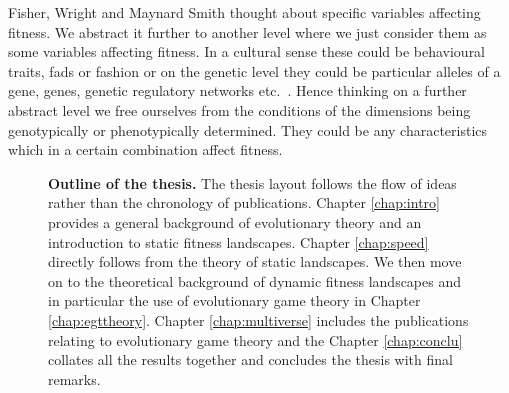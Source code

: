 \documentclass[oneside,11pt,a4paper]{book}
\begin{document}
Fisher, Wright and Maynard Smith thought about specific variables affecting fitness.
We abstract it further to another level where we just consider them as some variables affecting fitness.
In a cultural sense these could be behavioural traits, fads or fashion or on the genetic level they could be particular alleles of a gene, genes, genetic regulatory networks etc.\ .
Hence thinking on a further abstract level we free ourselves from the conditions of the dimensions being genotypically or phenotypically determined.
They could be any characteristics which in a certain combination affect fitness.
%
\begin{figure}[!h]
\begin{center}
\leavevmode
{}
\caption{\textbf{Outline of the thesis.}
\small{The thesis layout follows the flow of ideas rather than the chronology of publications.
Chapter \ref{chap:intro} provides a general background of evolutionary theory and an introduction to static fitness landscapes.
Chapter \ref{chap:speed} directly follows from the theory of static landscapes.
We then move on to the theoretical background of dynamic fitness landscapes and in particular the use of evolutionary game theory in Chapter \ref{chap:egttheory}. Chapter \ref{chap:multiverse} includes the publications relating to evolutionary game theory and the Chapter \ref{chap:conclu} collates all the results together and concludes the thesis with final remarks.}
}
\label{fig:outline1}
\end{center}
\end{figure}
%
\end{document}
